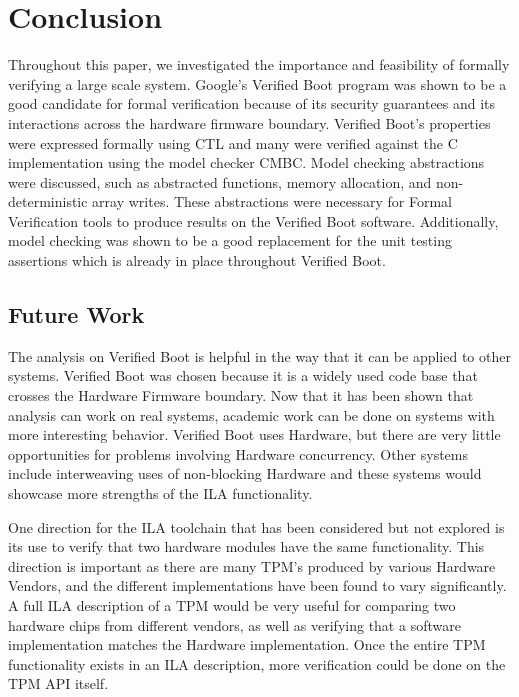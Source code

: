 \documentclass[../report.tex]{subfiles}
\begin{document}
\onehalfspacing

\section{Conclusion}

Throughout this paper, we investigated the importance and feasibility of formally verifying a large scale system.
Google's Verified Boot program was shown to be a good candidate for formal verification because of its security guarantees and its interactions across the hardware firmware boundary.
Verified Boot's properties were expressed formally using CTL and many were verified against the C implementation using the model checker CMBC\@. 
Model checking abstractions were discussed, such as abstracted functions, memory
allocation, and non-deterministic array writes.
These abstractions were necessary for Formal Verification tools to produce
results on the Verified Boot software.
Additionally, model checking was shown to be a good replacement for the unit
testing assertions which is already in place throughout Verified Boot.

\subsection{Future Work}

The analysis on Verified Boot is helpful in the way that it can be applied to
other systems. 
Verified Boot was chosen because it is a widely used code base
that crosses the Hardware Firmware boundary. 
Now that it has been shown that analysis can work on real systems, academic
work can be done on systems with more interesting behavior.
Verified Boot uses Hardware, but there are very little opportunities for
problems involving Hardware concurrency.
Other systems include interweaving uses of non-blocking
Hardware\cite{load-protocol} and these systems would showcase more strengths of the ILA functionality. 

One direction for the ILA toolchain that has been considered but not explored
is its use to verify that two hardware modules have the same functionality.
This direction is important as there are many TPM's produced by various Hardware
Vendors\cite{atmel-tpm}\cite{broadcom-tpm}\cite{infineon-tpm}, and the different 
implementations have been found to vary significantly\cite{tcg-inside}.
A full ILA description of a TPM would be very useful for comparing two hardware
chips from different vendors, as well as verifying that a software
implementation matches the Hardware implementation. 
Once the entire TPM functionality exists in an ILA description, more
verification could be done on the TPM API
itself\cite{TPM-state}\cite{TPM-spec-verif}.
\end{document}
